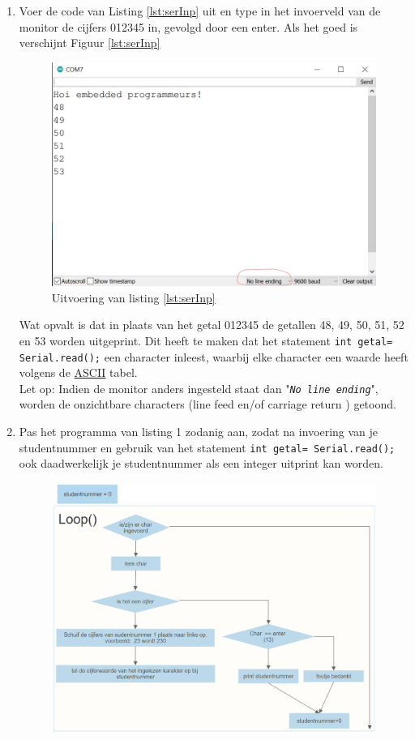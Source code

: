   \begin{enumerate}
 	\item Voer de code van Listing \ref{lst:serInp} uit en type in het invoerveld van de monitor de cijfers 012345 in, gevolgd door een enter.
 	Als het goed is verschijnt Figuur \ref{lst:serInp}
 
 \begin{figure}[h!]
 	\captionsetup{justification=centering}
 	\includegraphics[width=0.6 \linewidth]{figuren/ardMonChar.jpg}
 	\centering
	\caption{Uitvoering van listing \ref{lst:serInp}}
 		\label{fig:ardMonChr}
 \end{figure}
Wat opvalt is dat in plaats van het getal 012345 de getallen 48, 49, 50, 51, 52 en 53 worden uitgeprint. Dit heeft te maken dat het statement 
\texttt{int getal=\textcolor{BurntOrange}{ Serial.read}();} een character inleest, waarbij elke character een waarde heeft volgens de \href{https://nl.wikipedia.org/wiki/ASCII_(tekenset)}{ASCII} tabel.\\
Let op: Indien de monitor anders ingesteld staat dan "\texttt{\textit{No line ending}}", worden de onzichtbare characters (line feed en/of carriage return ) getoond. 
\item Pas het programma van listing 1 zodanig aan, zodat na invoering van je studentnummer en gebruik van het statement \texttt{int getal=\textcolor{BurntOrange}{ Serial.read}();} ook daadwerkelijk je studentnummer als een integer uitprint kan worden. 
 \begin{figure}[h!]
	\captionsetup{justification=centering}
	\includegraphics[width=0.8 \linewidth]{figuren/nummerloop}

\end{figure}
\end{enumerate}
